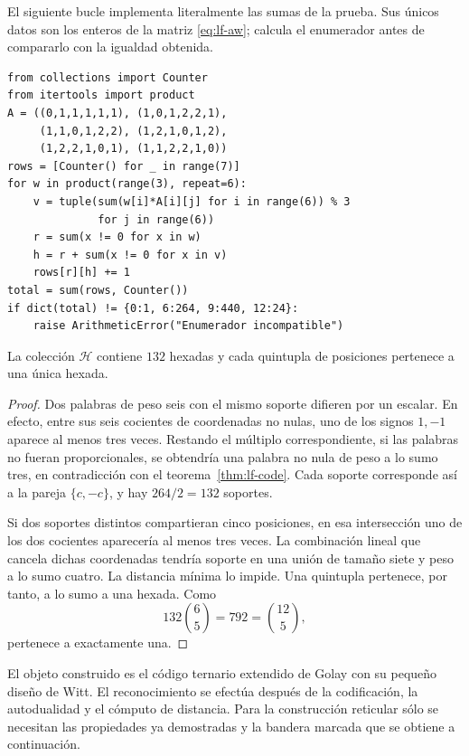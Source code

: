 \begin{remark}
El siguiente bucle implementa literalmente las sumas de la prueba.
Sus únicos datos son los enteros de la matriz
\eqref{eq:lf-aw}; calcula el enumerador antes de compararlo con
la igualdad obtenida.
\end{remark}
{\small
\begin{verbatim}
from collections import Counter
from itertools import product
A = ((0,1,1,1,1,1), (1,0,1,2,2,1),
     (1,1,0,1,2,2), (1,2,1,0,1,2),
     (1,2,2,1,0,1), (1,1,2,2,1,0))
rows = [Counter() for _ in range(7)]
for w in product(range(3), repeat=6):
    v = tuple(sum(w[i]*A[i][j] for i in range(6)) % 3
              for j in range(6))
    r = sum(x != 0 for x in w)
    h = r + sum(x != 0 for x in v)
    rows[r][h] += 1
total = sum(rows, Counter())
if dict(total) != {0:1, 6:264, 9:440, 12:24}:
    raise ArithmeticError("Enumerador incompatible")
\end{verbatim}
}

\begin{proposition}
\label{prop:lf-witt}
La colección \(\mathcal H\) contiene \(132\) hexadas y cada
quintupla de posiciones pertenece a una única hexada.
\end{proposition}
\begin{proof}
Dos palabras de peso seis con el mismo soporte difieren por
un escalar. En efecto, entre sus seis cocientes de coordenadas
no nulas, uno de los signos \(1,-1\) aparece al menos tres
veces. Restando el múltiplo correspondiente, si las palabras
no fueran proporcionales, se obtendría una palabra no nula
de peso a lo sumo tres, en contradicción con
el teorema~\ref{thm:lf-code}. Cada soporte corresponde así a
la pareja \(\{c,-c\}\), y hay \(264/2=132\) soportes.

Si dos soportes distintos compartieran cinco posiciones,
en esa intersección uno de los dos cocientes aparecería al
menos tres veces. La combinación lineal que cancela dichas
coordenadas tendría soporte en una unión de tamaño siete
y peso a lo sumo cuatro. La distancia mínima lo impide.
Una quintupla pertenece, por tanto, a lo sumo a una hexada.
Como
\[
 132\binom65=792=\binom{12}{5},
\]
pertenece a exactamente una.
\end{proof}

El objeto construido es el código ternario extendido de Golay
con su pequeño diseño de Witt. El reconocimiento se efectúa
después de la codificación, la autodualidad y el cómputo de
distancia. Para la construcción reticular sólo se necesitan
las propiedades ya demostradas y la bandera marcada que se
obtiene a continuación.

